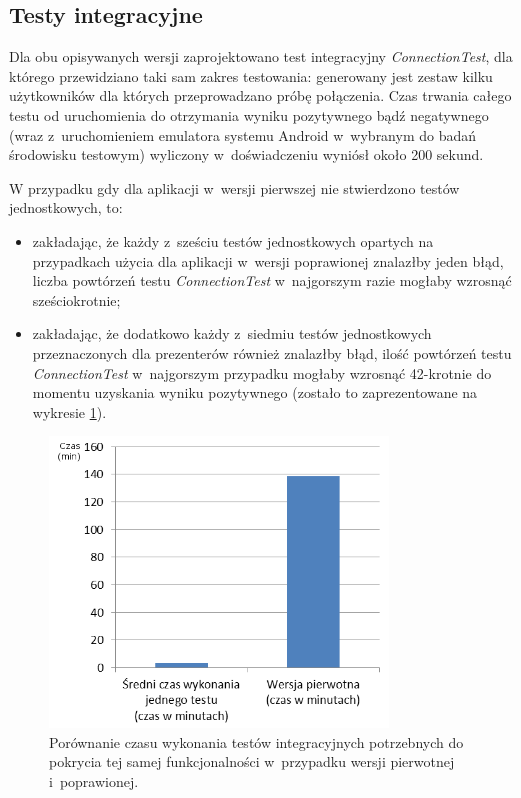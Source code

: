 \subsection{Testy integracyjne}
Dla obu opisywanych wersji zaprojektowano test integracyjny \textit{ConnectionTest}, dla którego przewidziano taki sam zakres testowania: generowany jest zestaw kilku użytkowników dla których przeprowadzano próbę połączenia. Czas trwania całego testu od uruchomienia do otrzymania wyniku pozytywnego bądź negatywnego (wraz z~uruchomieniem emulatora systemu Android w~wybranym do badań środowisku testowym) wyliczony w~doświadczeniu wyniósł około 200 sekund. 

W przypadku gdy dla aplikacji w~wersji pierwszej nie stwierdzono testów jednostkowych, to:
\begin{itemize}
\item
zakładając, że każdy z~sześciu testów jednostkowych opartych na przypadkach użycia dla aplikacji w~wersji poprawionej znalazłby jeden błąd, liczba powtórzeń testu \textit{ConnectionTest} w~najgorszym razie mogłaby wzrosnąć sześciokrotnie;
\item
zakładając, że dodatkowo każdy z~siedmiu testów jednostkowych przeznaczonych dla prezenterów również znalazłby błąd, ilość powtórzeń testu \textit{ConnectionTest} w~najgorszym przypadku mogłaby wzrosnąć 42-krotnie do momentu uzyskania wyniku pozytywnego (zostało to zaprezentowane na wykresie \ref{fig:app_int_czas}).
\end{itemize}
\begin{figure}[!htb]
    \centering
    \includegraphics[width=9cm]{imgs/ch6_app_int_czas_pl.png}
    \caption
{Porównanie czasu wykonania testów integracyjnych potrzebnych do pokrycia tej samej funkcjonalności w~przypadku wersji pierwotnej i~poprawionej. }
    \label{fig:app_int_czas}
\end{figure} 

